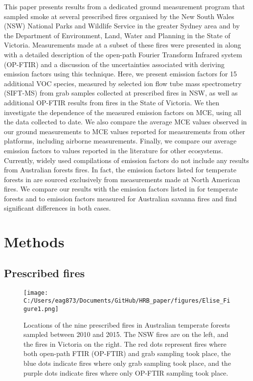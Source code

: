 \documentclass[acp, manuscript]{copernicus}
\begin{document}
This paper presents results from a dedicated ground measurement program that sampled smoke at several prescribed fires organised by the New South Wales (NSW) National Parks and Wildlife Service in the greater Sydney area and by the Department of Environment, Land, Water and Planning %
in the State of Victoria. Measurements made at a subset of these fires were presented in \citet{Paton-Walsh2014} along with a detailed description of the open-path Fourier Transform Infrared system (OP-FTIR) and a discussion of the uncertainties associated with deriving emission factors using this technique.
Here, we present emission factors for 15 additional VOC species, measured by selected ion flow tube mass spectrometry (SIFT-MS) from grab samples collected at prescribed fires in NSW, as well as additional OP-FTIR results from fires in the State of Victoria.
We then investigate the dependence of the measured emission factors on MCE, using all the data collected to date. We also compare the average MCE values observed in our ground measurements to MCE values reported for measurements from other platforms, including airborne measurements. Finally, we compare our average emission factors to values reported in the literature for other ecosystems. Currently, widely used compilations of emission factors \citep[e.g.,][]{Akagi2011} do not include any results from Australian forests fires. In fact, the emission factors listed for temperate forests in \citet{Akagi2011} are sourced exclusively from measurements made at North American fires. We compare our results with the emission factors listed in \citet[Table S4, February 2015 update]{Akagi2011} for temperate forests and to emission factors measured for Australian savanna fires \citep{Smith2014} and find significant differences in both cases. %

\section{Methods}
\subsection{Prescribed fires}


\begin{figure}
  \texttt{[image: C:/Users/eag873/Documents/GitHub/HRB\_paper/figures/Elise\_Figure1.png]}
  \caption{Locations of the nine prescribed fires in Australian temperate forests sampled between 2010 and 2015. The NSW fires are on the left, and the fires in Victoria on the right. The red dots represent fires where both open-path FTIR (OP-FTIR) and grab sampling took place, the blue dots indicate fires where only grab sampling took place, and the purple dots indicate fires where only OP-FTIR sampling took place.}
  \label{fig:map}
\end{figure}
\end{document}
